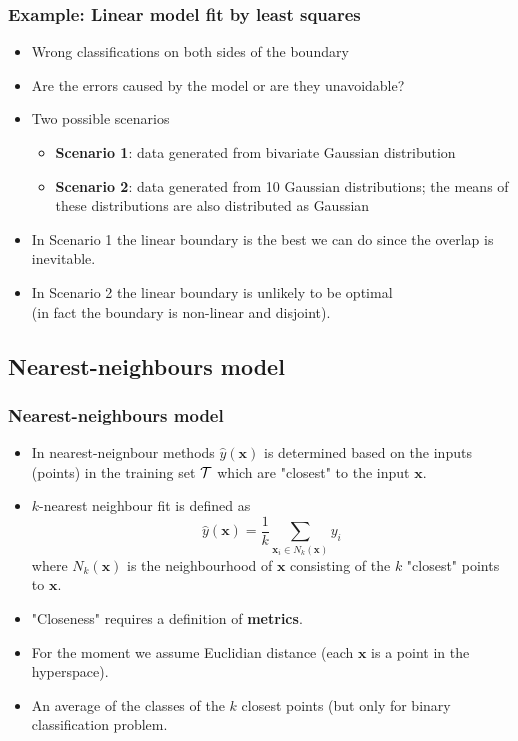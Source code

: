 \documentclass[notes]{beamer}          %
\newcommand{\vect}[1]{\bm{#1}}
\begin{document}
\begin{frame}
\frametitle{Example: Linear model fit by least squares}
\begin{itemize}
    \item Wrong classifications on both sides of the boundary
    \item Are the errors caused by the model or are they unavoidable?
    \item Two possible scenarios
        \begin{itemize}
            \item {\bf Scenario 1}: data generated from bivariate Gaussian distribution
            \item {\bf Scenario 2}: data generated from 10 Gaussian distributions; the means of these distributions are also distributed as Gaussian
        \end{itemize}
    \item In Scenario 1 the linear boundary is the best we can do since the overlap is inevitable.
    \item In Scenario 2 the linear boundary is unlikely to be optimal \\
          (in fact the boundary is non-linear and disjoint).
\end{itemize}

\end{frame}


\subsection{Nearest-neighbours model}

\begin{frame}
\frametitle{Nearest-neighbours model}
    \begin{itemize}
        \item In nearest-neignbour methods $\hat{y}(\vect{x})$ is determined based on the inputs (points) in the training set $\cal{T}$ which are "closest" to the input $\vect{x}$.
        \item $k$-nearest neighbour fit is defined as
        $$ \hat{y}(\vect{x}) = \frac{1}{k} \sum_{\vect{x}_i \in N_k(\vect{x})} y_i $$
        where $N_k(\vect{x})$ is the neighbourhood of $\vect{x}$ consisting of the $k$ "closest" points to $\vect{x}$.
        \item "Closeness" requires a definition of {\bf metrics}.
        \item For the moment we assume Euclidian distance (each $\vect{x}$ is a point in the hyperspace).
        \item An average of the classes of the $k$ closest points (but only for binary classification problem.
    \end{itemize}
\end{frame}
\end{document}
